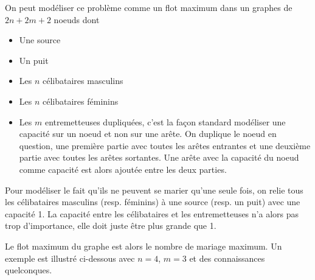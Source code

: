 \begin{solution}
  On peut modéliser ce problème comme un flot maximum dans un graphes de $2n + 2m + 2$ noeuds dont
  \begin{itemize}
    \item Une source
    \item Un puit
    \item Les $n$ célibataires masculins
    \item Les $n$ célibataires féminins
    \item Les $m$ entremetteuses dupliquées,
      c'est la façon standard modéliser une capacité sur un noeud et non sur une arête.
      On duplique le noeud en question, une première partie avec toutes les arêtes entrantes
      et une deuxième partie avec toutes les arêtes sortantes.
      Une arête avec la capacité du noeud comme capacité est alors ajoutée entre les deux parties.
  \end{itemize}
  Pour modéliser le fait qu'ils ne peuvent se marier qu'une seule fois, on relie tous les célibataires
  masculins (resp. féminins) à une source (resp. un puit) avec une capacité 1.
  La capacité entre les célibataires et les entremetteuses n'a alors pas trop d'importance,
  elle doit juste être plus grande que 1.

  Le flot maximum du graphe est alors le nombre de mariage maximum.
  Un exemple est illustré ci-dessous avec $n = 4$, $m = 3$ et des connaissances quelconques.
  \begin{center}
  \end{center}
\end{solution}


